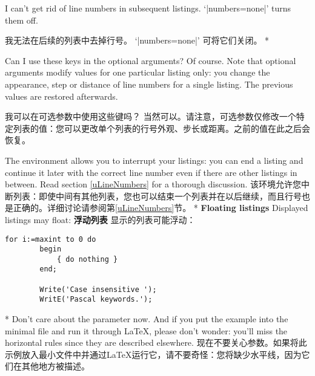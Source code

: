 \begin{advise}
\begin{paracol}{2}    
\item I can't get rid of line numbers in subsequent listings.
\advisespace
`|numbers=none|' turns them off.
\switchcolumn
\item 我无法在后续的列表中去掉行号。
\advisespace
`|numbers=none|' 可将它们关闭。
\switchcolumn[0]*
\item Can I use these keys in the optional arguments?
\advisespace
Of course. Note that optional arguments modify values for one
particular listing only: you change the appearance, step or distance
of line numbers for a single listing. The previous values are
restored afterwards.
\switchcolumn
\item 我可以在可选参数中使用这些键吗？
\advisespace
当然可以。请注意，可选参数仅修改一个特定列表的值：您可以更改单个列表的行号外观、步长或距离。之前的值在此之后会恢复。
\end{paracol}
\end{advise}

\begin{paracol}{2}
The environment allows you to interrupt your listings: you can end a listing
and continue it later with the correct line number even if there are other
listings in between. Read section \ref{uLineNumbers} for a thorough
discussion.
\switchcolumn
该环境允许您中断列表：即使中间有其他列表，您也可以结束一个列表并在以后继续，而且行号也是正确的。详细讨论请参阅第\ref{uLineNumbers}节。
\switchcolumn[0]*%
\textbf{Floating listings}
Displayed listings may float:
\switchcolumn
\textbf{浮动列表}
显示的列表可能浮动：
\begin{lstsample}{\lstset{frame=tb}}{}
        \begin{lstlisting}[float,caption=A floating example]
        for i:=maxint to 0 do
        begin
            { do nothing }
        end;

        Write('Case insensitive ');
        WritE('Pascal keywords.');
        \end{lstlisting}
\end{lstsample}
\switchcolumn[0]*%
Don't care about the parameter  now. And if you put the
example into the minimal file and run it through \LaTeX, please don't wonder:
you'll miss the horizontal rules since they are described elsewhere.
\switchcolumn
现在不要关心参数。如果将此示例放入最小文件中并通过\LaTeX 运行它，请不要奇怪：您将缺少水平线，因为它们在其他地方被描述。
\end{paracol}

